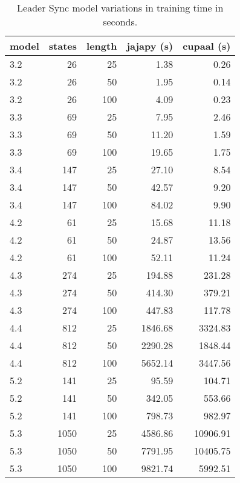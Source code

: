 \begin{table}
    \centering
    \caption{Leader Sync model variations in training time in seconds.}
    \label{tab:leader_results}
    \begin{tabular}{lrrrr}
        \toprule
        model & states & length & jajapy (s) & cupaal (s) \\
        \midrule
        3.2   & 26     & 25     & 1.38       & 0.26       \\
        3.2   & 26     & 50     & 1.95       & 0.14       \\
        3.2   & 26     & 100    & 4.09       & 0.23       \\
        3.3   & 69     & 25     & 7.95       & 2.46       \\
        3.3   & 69     & 50     & 11.20      & 1.59       \\
        3.3   & 69     & 100    & 19.65      & 1.75       \\
        3.4   & 147    & 25     & 27.10      & 8.54       \\
        3.4   & 147    & 50     & 42.57      & 9.20       \\
        3.4   & 147    & 100    & 84.02      & 9.90       \\
        4.2   & 61     & 25     & 15.68      & 11.18      \\
        4.2   & 61     & 50     & 24.87      & 13.56      \\
        4.2   & 61     & 100    & 52.11      & 11.24      \\
        4.3   & 274    & 25     & 194.88     & 231.28     \\
        4.3   & 274    & 50     & 414.30     & 379.21     \\
        4.3   & 274    & 100    & 447.83     & 117.78     \\
        4.4   & 812    & 25     & 1846.68    & 3324.83    \\
        4.4   & 812    & 50     & 2290.28    & 1848.44    \\
        4.4   & 812    & 100    & 5652.14    & 3447.56    \\
        5.2   & 141    & 25     & 95.59      & 104.71     \\
        5.2   & 141    & 50     & 342.05     & 553.66     \\
        5.2   & 141    & 100    & 798.73     & 982.97     \\
        5.3   & 1050   & 25     & 4586.86    & 10906.91   \\
        5.3   & 1050   & 50     & 7791.95    & 10405.75   \\
        5.3   & 1050   & 100    & 9821.74    & 5992.51    \\
        \bottomrule
    \end{tabular}
\end{table}


